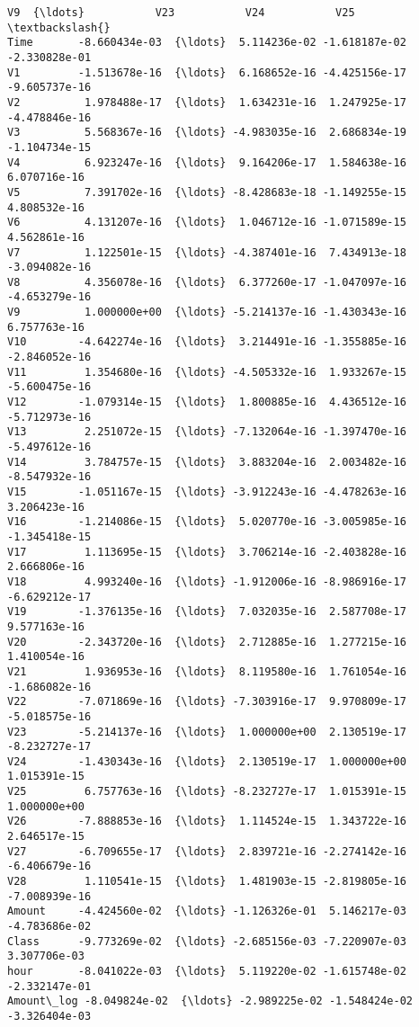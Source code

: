 \documentclass[11pt]{article}
\begin{document}
\begin{tcolorbox}[breakable, size=fbox, boxrule=.5pt, pad at break*=1mm, opacityfill=0]
\begin{Verbatim}[commandchars=\\\{\}]
                      V9  {\ldots}           V23           V24           V25  \textbackslash{}
Time       -8.660434e-03  {\ldots}  5.114236e-02 -1.618187e-02 -2.330828e-01
V1         -1.513678e-16  {\ldots}  6.168652e-16 -4.425156e-17 -9.605737e-16
V2          1.978488e-17  {\ldots}  1.634231e-16  1.247925e-17 -4.478846e-16
V3          5.568367e-16  {\ldots} -4.983035e-16  2.686834e-19 -1.104734e-15
V4          6.923247e-16  {\ldots}  9.164206e-17  1.584638e-16  6.070716e-16
V5          7.391702e-16  {\ldots} -8.428683e-18 -1.149255e-15  4.808532e-16
V6          4.131207e-16  {\ldots}  1.046712e-16 -1.071589e-15  4.562861e-16
V7          1.122501e-15  {\ldots} -4.387401e-16  7.434913e-18 -3.094082e-16
V8          4.356078e-16  {\ldots}  6.377260e-17 -1.047097e-16 -4.653279e-16
V9          1.000000e+00  {\ldots} -5.214137e-16 -1.430343e-16  6.757763e-16
V10        -4.642274e-16  {\ldots}  3.214491e-16 -1.355885e-16 -2.846052e-16
V11         1.354680e-16  {\ldots} -4.505332e-16  1.933267e-15 -5.600475e-16
V12        -1.079314e-15  {\ldots}  1.800885e-16  4.436512e-16 -5.712973e-16
V13         2.251072e-15  {\ldots} -7.132064e-16 -1.397470e-16 -5.497612e-16
V14         3.784757e-15  {\ldots}  3.883204e-16  2.003482e-16 -8.547932e-16
V15        -1.051167e-15  {\ldots} -3.912243e-16 -4.478263e-16  3.206423e-16
V16        -1.214086e-15  {\ldots}  5.020770e-16 -3.005985e-16 -1.345418e-15
V17         1.113695e-15  {\ldots}  3.706214e-16 -2.403828e-16  2.666806e-16
V18         4.993240e-16  {\ldots} -1.912006e-16 -8.986916e-17 -6.629212e-17
V19        -1.376135e-16  {\ldots}  7.032035e-16  2.587708e-17  9.577163e-16
V20        -2.343720e-16  {\ldots}  2.712885e-16  1.277215e-16  1.410054e-16
V21         1.936953e-16  {\ldots}  8.119580e-16  1.761054e-16 -1.686082e-16
V22        -7.071869e-16  {\ldots} -7.303916e-17  9.970809e-17 -5.018575e-16
V23        -5.214137e-16  {\ldots}  1.000000e+00  2.130519e-17 -8.232727e-17
V24        -1.430343e-16  {\ldots}  2.130519e-17  1.000000e+00  1.015391e-15
V25         6.757763e-16  {\ldots} -8.232727e-17  1.015391e-15  1.000000e+00
V26        -7.888853e-16  {\ldots}  1.114524e-15  1.343722e-16  2.646517e-15
V27        -6.709655e-17  {\ldots}  2.839721e-16 -2.274142e-16 -6.406679e-16
V28         1.110541e-15  {\ldots}  1.481903e-15 -2.819805e-16 -7.008939e-16
Amount     -4.424560e-02  {\ldots} -1.126326e-01  5.146217e-03 -4.783686e-02
Class      -9.773269e-02  {\ldots} -2.685156e-03 -7.220907e-03  3.307706e-03
hour       -8.041022e-03  {\ldots}  5.119220e-02 -1.615748e-02 -2.332147e-01
Amount\_log -8.049824e-02  {\ldots} -2.989225e-02 -1.548424e-02 -3.326404e-03


\end{Verbatim}
\end{tcolorbox}
\end{document}
